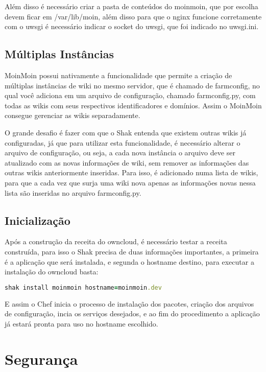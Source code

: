 Além disso é necessário criar a pasta de conteúdos do moinmoin, que por
escolha devem ficar em /var/lib/moin, além disso para que o nginx funcione corretamente
com o uwsgi é necessário indicar o socket do uwsgi, que foi indicado no uwsgi.ini.

\subsection{Múltiplas Instâncias}

MoinMoin possui nativamente a funcionalidade
que permite a criação de múltiplas instâncias de wiki no mesmo servidor,
que é chamado de farmconfig, no qual você adiciona em um arquivo de configuração,
chamado farmconfig.py, com todas as wikis com seus respectivos identificadores 
e domínios. Assim
o MoinMoin consegue gerenciar as wikis separadamente. 

O grande desafio é fazer
com que o Shak entenda que existem outras wikis já configuradas, já que para
utilizar esta funcionalidade,
é necessário alterar o arquivo de configuração, ou seja, a cada nova instância
o arquivo deve ser atualizado com as novas informações de wiki, sem remover as
informações das outras wikis anteriormente inseridas. Para isso, é adicionado
numa lista de wikis, para que a cada vez que surja uma wiki nova apenas as
informações novas nessa lista são inseridas no arquivo farmconfig.py.

\subsection{Inicialização}

Após a construção da receita do owncloud, é necessário testar a receita construída,
para isso o Shak precisa de duas informações importantes, a primeira é a aplicação
que será instalada, e segunda o hostname destino, para executar a instalação
do owncloud basta:

\begin{lstlisting}[language=Ruby,label=dice_index,caption={Exemplo de execução de instalação do owncloud com shak}]
shak install moinmoin hostname=moinmoin.dev
\end{lstlisting}

E assim o Chef inicia o processo de instalação dos pacotes, criação dos arquivos
de configuração, incia os serviços desejados, e ao fim do procedimento a aplicação
já estará pronta para uso no hostname escolhido.

\section{Segurança}
\label{sub:seguranca}

